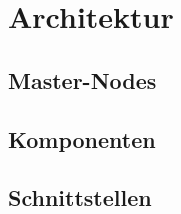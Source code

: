 \section{Architektur}
\subsection{Master-Nodes}
\subsection{Komponenten}
\subsection{Schnittstellen}
\clearpage